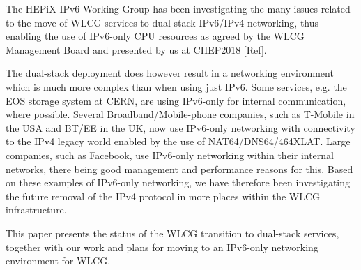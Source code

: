 

 


The HEPiX IPv6 Working Group \cite{ipv6wg} has been investigating the many issues related to the 
move of WLCG services to dual-stack IPv6/IPv4 networking, thus enabling the use of
IPv6-only CPU resources as agreed by the WLCG Management Board and presented by us at 
CHEP2018 [Ref]. 

The dual-stack deployment does however result in a networking environment
which is much more complex than when using just IPv6. Some services, e.g.
the EOS storage system at CERN, are using IPv6-only for internal communication,
where possible. Several Broadband/Mobile-phone companies, such as T-Mobile in the USA and
BT/EE in the UK, now use IPv6-only networking with connectivity to the IPv4
legacy world enabled by the use of NAT64/DNS64/464XLAT. Large companies, such
as Facebook, use IPv6-only networking within their internal networks, there
being good management and performance reasons for this. Based on these examples
of IPv6-only networking, we have therefore been  investigating the future removal of the IPv4 protocol in
more places within the WLCG infrastructure.

This paper presents the status of the WLCG transition to dual-stack services, together with 
our work and plans for moving to an IPv6-only networking environment for WLCG.

